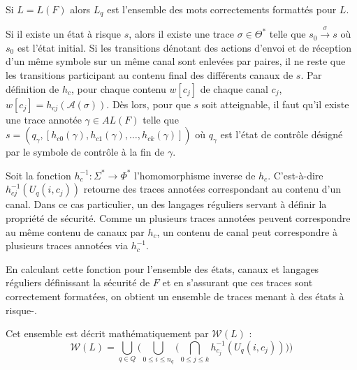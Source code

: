 Si $L=L(F)$ alors $L_q$ est l'ensemble des mots correctements formattés pour $L$.

Si il existe un état à risque $s$, alors il existe une trace $\sigma \in \Theta^*$ telle que $s_0\xrightarrow{\sigma}s$ où $s_0$ est l'état initial. Si les transitions dénotant des actions d'envoi et de réception d'un même symbole sur un même canal sont enlevées par paires, il ne reste que les transitions participant au contenu final des différents canaux de $s$. Par définition de $h_c$, pour chaque contenu $w[c_j]$ de chaque canal $c_j$, $w[c_j]=h_{cj}(\mathcal{A}(\sigma))$. Dès lors, pour que $s$ soit atteignable, il faut qu'il existe une trace annotée $\gamma \in AL(F)$ telle que $s=(q_\gamma, [h_{c0}(\gamma),h_{c1}(\gamma),\dots,h_{ck}(\gamma)])$ où $q_\gamma$ est l'état de contrôle désigné par le symbole de contrôle à la fin de $\gamma$.

Soit la fonction $h^{-1}_{c}:\Sigma^*\rightarrow\Phi^*$ l'homomorphisme inverse de $h_c$. C'est-à-dire $h^{-1}_{cj}(U_q(i,c_j))$ retourne des traces annotées correspondant au contenu d'un canal. Dans ce cas particulier, un des langages réguliers servant à définir la propriété de sécurité. Comme un plusieurs traces annotées peuvent correspondre au même contenu de canaux par $h_c$, un contenu de canal peut correspondre à plusieurs traces annotées via $h^{-1}_c$.

En calculant cette fonction pour l'ensemble des états, canaux et langages réguliers définissant la sécurité de $F$ et en s'assurant que ces traces sont correctement formatées, on obtient un ensemble de traces menant à des états à risque-.

Cet ensemble est décrit mathématiquement par $\mathcal{W}(L)$ :
$$
\mathcal{W}(L)=\bigcup_{q\in Q}\big(\bigcup_{0\leq i\leq n_q}\big(\bigcap_{0\leq j \leq k}h_{c_j}^{-1}(U_q(i,c_j))\big)\big)
$$
